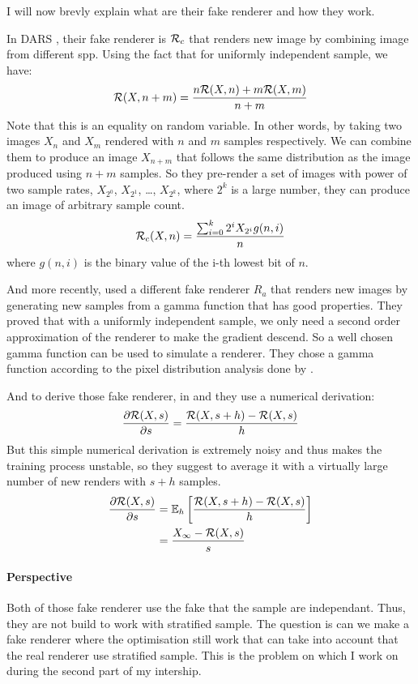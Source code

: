\documentclass{classeENS}
\begin{document}
I will now brevly explain what are their fake renderer and how they work.

\par In DARS \cite{kuznetsov2018deep}, their fake renderer is $\mathcal R_{c}$ that renders 
new image by combining image from different spp. Using the fact that 
for uniformly independent sample, we have:
\[ \mathcal R(X,n+m) = \frac{n\mathcal R(X,n) + m\mathcal R(X,m)}{n+m} \]
Note that this is an equality on random variable. In other words, by taking two 
images $X_n$ and $X_m$ rendered with $n$ and $m$ samples 
respectively. We can combine them to produce an image $X_{n+m}$ that follows the same 
distribution as the image produced using $n+m$ samples.
So they  pre-render a set of images with power of two sample rates, $X_{2^0}$, $X_{2^1}$, \dots, $X_{2^k}$, 
where $2^k$ is a large number, they can produce an image of arbitrary sample count.
\begin{equation}
    \label{eq:3}
    \mathcal R_c(X,n) = \frac{\sum_{i=0}^k 2^i X_{2^i} g(n,i)}{n}
\end{equation}
where $g(n,i)$ is the binary value of the i-th lowest bit of $n$.

\par And more recently, \cite{10.1145/3550454.3555515} used a different fake 
  renderer $R_{a}$ that renders new images by generating
  new samples from a gamma function that has good properties. They proved
  that with a uniformly independent sample, we only need a second order 
  approximation of the renderer to make the gradient descend. So a well 
  chosen gamma function can be used to simulate a renderer. They chose a 
  gamma function according to the pixel distribution analysis done by 
  \cite{elek2019learning}.

\par And to derive those fake renderer, in \cite{kuznetsov2018deep} and
\cite{10.1145/3550454.3555515} they use a numerical derivation:
  \[ \frac{\partial \mathcal R(X,s)}{\partial s} = \frac{\mathcal R(X,s+h) - \mathcal R(X,s)}{h}\]
  But this simple numerical derivation is extremely noisy and thus makes the 
  training process unstable, so they suggest to average 
  it with a virtually large number of new renders with $s+h$ samples.
  \begin{align}
      \label{eq:4}
      \frac{\partial \mathcal R(X,s)}{\partial s} & = \mathbb E_h \left [\frac{\mathcal R(X,s+h) - \mathcal R(X,s)}{h} \right ] \\
      & = \frac{X_\infty - \mathcal R(X,s)}{s}
  \end{align}

\paragraph*{Perspective} Both of those fake renderer use the fake that the sample are
independant. Thus, they are not build to work with stratified sample. The question is
can we make a fake renderer where the optimisation still work that can take into account
that the real renderer use stratified sample. This is the problem on which I work 
on during the second part of my intership.
\end{document}
